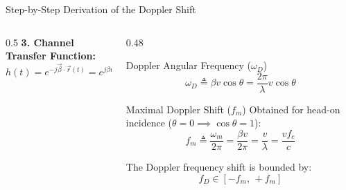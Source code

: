 \documentclass[aspectratio=169, 10pt]{beamer}
\begin{document}
\begin{frame}{Step-by-Step Derivation of the Doppler Shift}
\begin{columns}[T]
\begin{column}{0.5\textwidth}
            \textbf{3. Channel Transfer Function:}
            \begin{equation}
                h(t) = e^{-j\vec{\beta} \cdot \vec{r}(t)} = e^{j\beta v \cos\theta \cdot t} = e^{j\omega_D t}
            \end{equation}
        \end{column}
\vspace{-1em}
        \begin{column}{0.48\textwidth}
            \begin{block}{Doppler Angular Frequency ($\omega_D$)}
                \begin{equation}
                    \boxed{\omega_D \triangleq \beta v \cos\theta = \frac{2\pi}{\lambda} v \cos\theta}
                \end{equation}
            \end{block}
\vspace{-1em}
            \begin{alertblock}{Maximal Doppler Shift ($f_m$)}
                Obtained for head-on incidence ($\theta = 0 \implies \cos\theta = 1$):
                \begin{equation}
                    \boxed{f_m \triangleq \frac{\omega_m}{2\pi} = \frac{\beta v}{2\pi} = \frac{v}{\lambda} = \frac{v f_c}{c}}
                \end{equation}
            \end{alertblock}
            The Doppler frequency shift is bounded by:
            \vspace{-1em}
            \begin{equation*}
                f_D \in [-f_m, \, +f_m]
            \end{equation*}
        \end{column}
    \end{columns}
\end{frame}
\end{document}
